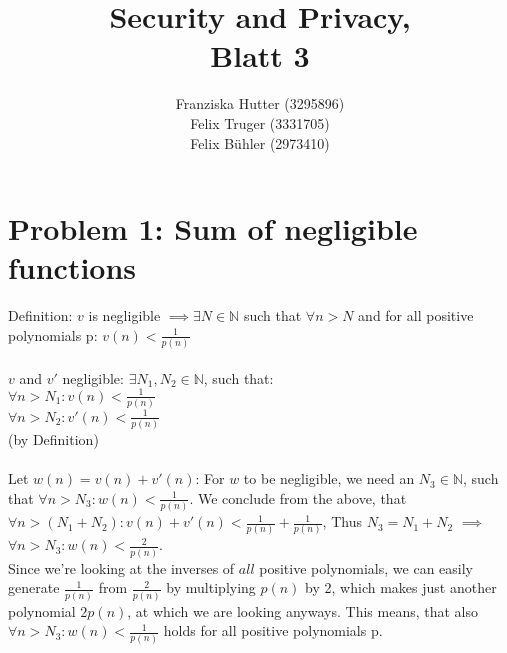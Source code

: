 \documentclass[12pt,pdftex,a4paper]{article}
\title{Security and Privacy,\\ Blatt 3}
\author{Franziska Hutter (3295896)\\
	Felix Truger (3331705)\\
	Felix Bühler (2973410)}
\newcommand\tab[1][1cm]{\hspace*{#1}}
\begin{document}
\maketitle
\pagebreak

\section*{Problem 1: Sum of negligible functions}
Definition: $v$ is negligible $\implies \exists N \in\mathbb{N}$ such that $\forall n>N$ and for all positive polynomials p: 
$v(n) < \frac{1}{p(n)}$
\\~\\
$v$ and $v'$ negligible: $\exists N_1, N_2 \in \mathbb{N}$, such that: \\
\tab $\forall n>N_1: v(n) < \frac{1}{p(n)}$\\
\tab $\forall n>N_2: v'(n) < \frac{1}{p(n)}$\\
(by Definition)\\
\\
Let $w(n) = v(n) + v'(n)$: For $w$ to be negligible, we need an $N_3\in\mathbb{N}$, such that $\forall n>N_3: w(n) < \frac{1}{p(n)}$.
We conclude from the above, that $\forall n>(N_1+N_2): v(n) + v'(n) < \frac{1}{p(n)} + \frac{1}{p(n)}$, Thus $N_3 = N_1 + N_2$ $\implies$ $\forall n > N_3: w(n) < \frac{2}{p(n)}$.\\ %
Since we're looking at the inverses of $all$ positive polynomials, we can easily generate $\frac{1}{p(n)}$ from $\frac{2}{p(n)}$ by multiplying $p(n)$ by 2, which makes just another polynomial $2p(n)$, at which we are looking anyways. This means, that also $\forall n>N_3: w(n) < \frac{1}{p(n)}$ holds for all positive polynomials p.

\end{document}
